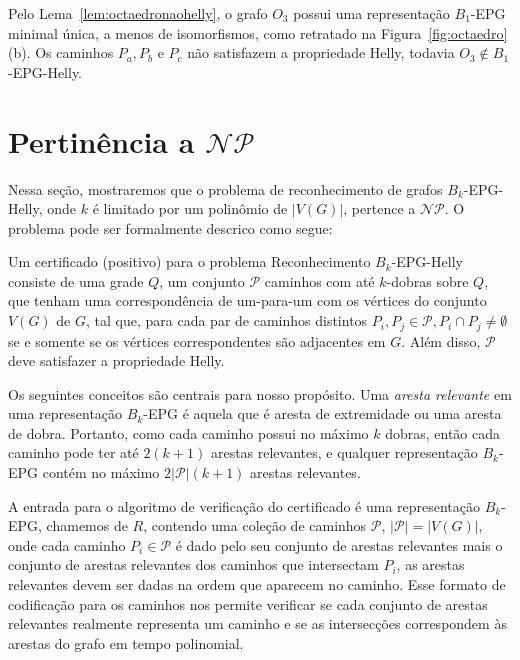Pelo Lema~\ref{lem:octaedronaohelly}, o grafo $ O_3 $ possui uma representação  $B_1$-EPG minimal única, a menos de isomorfismos, como retratado na Figura~\ref{fig:octaedro}(b). Os caminhos $ P_a, P_b $ e $ P_c $  não satisfazem a propriedade Helly, todavia $O_3 \notin B_1$-EPG-Helly. 

\section{Pertinência a $\mathcal{NP}$}

Nessa seção, mostraremos que o problema de reconhecimento de grafos $B_k$-EPG-Helly, onde $k$ é limitado por um polinômio de $|V(G)|$, pertence a  $\mathcal{NP}$. O problema pode ser formalmente descrico como segue:



Um certificado (positivo) para o problema {\sc Reconhecimento $B_k$-EPG-Helly} consiste de uma grade $Q$, um conjunto $\mathcal{P}$ caminhos com até $k$-dobras sobre $Q$, que tenham uma correspondência de um-para-um com os vértices do conjunto $V(G)$ de $G$, tal que, para cada par de caminhos distintos $P_i, P_j\in \mathcal{P}, P_i\cap P_j \neq \emptyset $  se e somente se os vértices correspondentes são adjacentes em $G$. Além disso, $\mathcal{P}$ deve satisfazer a propriedade Helly.

Os seguintes conceitos são centrais para nosso propósito.
Uma \emph{aresta relevante} em uma representação $B_k$-EPG é aquela que é aresta de extremidade ou uma aresta de dobra. Portanto, como cada caminho possui no máximo $k$ dobras, então cada caminho pode ter até $2(k+1)$ arestas relevantes, e qualquer representação $B_k$-EPG contém no máximo $2|\mathcal{P}|(k+1)$ arestas relevantes.

A entrada para o algoritmo de verificação do certificado é uma representação $B_k$-EPG, chamemos de $R$, contendo uma coleção de caminhos $\mathcal{P}$, $|\mathcal{P}|=|V(G)|$, onde cada caminho  $P_i \in \mathcal{P}$ é dado pelo seu conjunto de arestas relevantes mais o conjunto de arestas relevantes dos caminhos que intersectam   $P_i$, as arestas relevantes devem ser dadas na ordem que aparecem no caminho. Esse formato de codificação para os caminhos nos permite verificar se cada conjunto de arestas relevantes realmente representa um caminho e se as intersecções correspondem às arestas do grafo em tempo polinomial.

